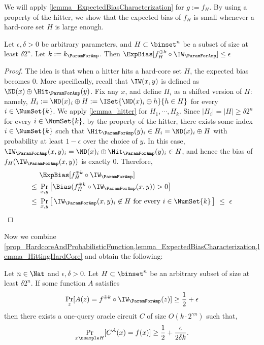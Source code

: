 \documentclass{toc}
\begin{document}
We will apply \cref{lemma_ExpectedBiasCharacterization} for $g := f_H$.
By using a property of the hitter, we show that the expected bias of $f_H$ is small whenever a hard-core set $H$ is large enough.
\begin{lemma}
  \label{lemma_HittingHardCore}
  Let $\epsilon, \delta > 0$ be arbitrary parameters, and $H \subset \binset^n$ be a subset of size at least $\delta 2^n$.
  Let $k := k_\ParamForAmp$.
  Then
  $\ExpBias[f_H^{\oplus k} \circ \IW_\ParamForAmp] \le \epsilon$
\end{lemma}
\begin{proof}
  The idea is that when a hitter hits a hard-core set $H$, the expected bias becomes $0$.
  More specifically,
  recall that $\IW(x, y)$ is defined as $\ND(x) \oplus \Hit_\ParamForAmp(y)$.
  Fix any $x$, and define $H_i$ as a shifted version of $H$: namely, $H_i := \ND(x)_i \oplus H := \ISet{\ND(x)_i \oplus h}{h \in H}$ for every $i \in \NumSet{k}$.
  We apply \cref{lemma_hitter} for $H_1, \cdots, H_k$.
  Since $|H_i| = |H| \ge \delta 2^n$ for every $i \in \NumSet{k}$, by the property of the hitter,
  there exists some index $i \in \NumSet{k}$
  such that
  $\Hit_\ParamForAmp(y)_i \in H_i = \ND(x)_i \oplus H$ with probability at least $1 - \epsilon$ over the choice of $y$.
  In this case,
  $\IW_\ParamForAmp(x, y)_i = \ND(x)_i \oplus \Hit_\ParamForAmp(y)_i \in H$,
  and hence the bias of $f_H(\IW_\ParamForAmp(x, y))$ is exactly $0$.
  Therefore,
  \begin{align*}
    \  & \ExpBias[f_H^{\oplus k} \circ \IW_\ParamForAmp]
    \\ \le\ & \Pr_{x, y} \left[ \Bias( f_H^{\oplus k} \circ \IW_\ParamForAmp (x, y) )  > 0\right]
    \\ \le\ & \Pr_{x, y} \left[\, \IW_\ParamForAmp(x, y)_i \not\in H \text{ for every $i\in\NumSet{k}$}\, \right]\ \le\ \epsilon
  \end{align*}
\end{proof}

Now we combine \cref{prop_HardcoreAndProbabilisticFunction,lemma_ExpectedBiasCharacterization,lemma_HittingHardCore}
and obtain the following:

\begin{corollary}
  \label{cor_BoostingPremise}
  Let $n \in \Nat$ and $\epsilon, \delta > 0$.
  Let $H \subset \binset^n$ be an arbitrary subset of size at least $\delta 2^n$.
  If some function $A$ satisfies
  \begin{align*}
    \Pr_z[ A(z) = f^{\oplus k} \circ \IW_\ParamForAmp(z) ] \ge \frac{1}{2} + \epsilon
  \end{align*}
  then
  there exists a one-query oracle circuit $C$ of size $O(k \cdot 2^{\gamma n})$ such that,
  \begin{align*}
    \Pr_{x \usample H} [ C^A(x) = f(x) ] \ge \frac{1}{2} + \frac{\epsilon } { 2 \delta k }.
  \end{align*}
\end{corollary}
\end{document}
